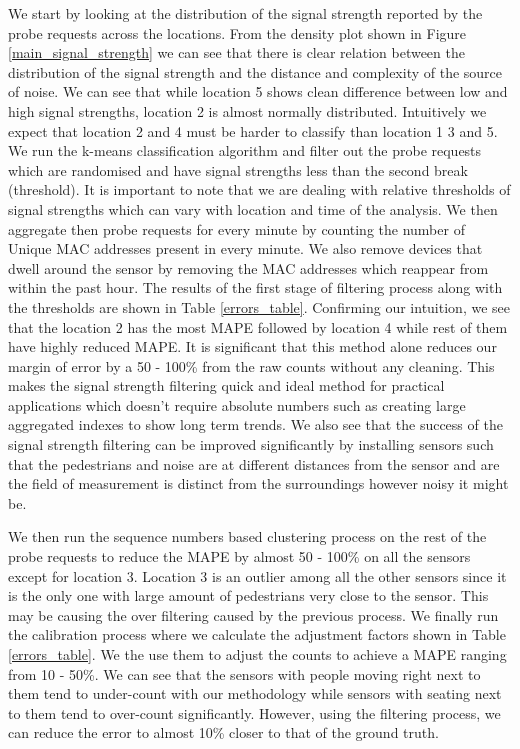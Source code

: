 We start by looking at the distribution of the signal strength reported by the probe requests across the locations. From the density plot shown in Figure \ref{main_signal_strength} we can see that there is clear relation between the distribution of the signal strength and the distance and complexity of the source of noise. We can see that while location 5 shows clean difference between low and high signal strengths, location 2 is almost normally distributed.
Intuitively we expect that location 2 and 4 must be harder to classify than location 1 3 and 5. 
We run the k-means classification algorithm and filter out the probe requests which are randomised and have signal strengths less than the second break (threshold). 
It is important to note that we are dealing with relative thresholds of signal strengths which can vary with location and time of the analysis.
We then aggregate then probe requests for every minute by counting the number of Unique MAC addresses present in every minute. We also remove devices that dwell around the sensor by removing the MAC addresses which reappear from within the past hour.
The results of the first stage of filtering process along with the thresholds are shown in Table \ref{errors_table}. Confirming our intuition, we see that the location 2 has the most MAPE followed by location 4 while rest of them have highly reduced MAPE.
It is significant that this method alone reduces our margin of error by a 50 - 100\% from the raw counts without any cleaning.
This makes the signal strength filtering quick and ideal method for practical applications which doesn't require absolute numbers such as creating large aggregated indexes to show long term trends. 
We also see that the success of the signal strength filtering can be improved significantly by installing sensors such that the pedestrians and noise are at different distances from the sensor and are the field of measurement is distinct from the surroundings however noisy it might be.

We then run the sequence numbers based clustering process on the rest of the probe requests to reduce the MAPE by almost 50 - 100\% on all the sensors except for location 3.
Location 3 is an outlier among all the other sensors since it is the only one with large amount of pedestrians very close to the sensor.
This may be causing the over filtering caused by the previous process.
We finally run the calibration process where we calculate the adjustment factors shown in Table \ref{errors_table}.
We the use them to adjust the counts to achieve a MAPE ranging from 10 - 50\%. We can see that the sensors with people moving right next to them tend to under-count with our methodology while sensors with seating next to them tend to over-count significantly. However, using the filtering process, we can reduce the error to almost 10\% closer to that of the ground truth.

